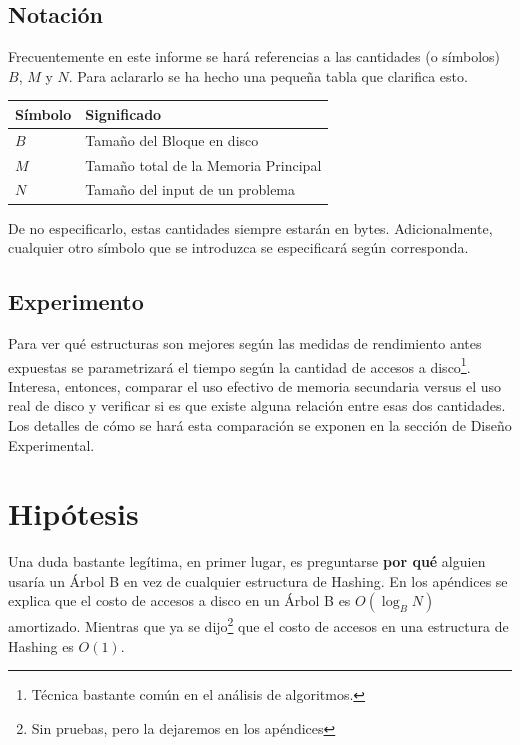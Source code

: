 \documentclass[12pt,letterpaper]{report}
\begin{document}
\subsection{Notación}

Frecuentemente en este informe se hará referencias a las cantidades (o símbolos) $B$, $M$ y $N$. Para aclararlo se ha hecho una pequeña tabla que clarifica esto.

\begin{center}
\begin{tabular}{l|l}
Símbolo & Significado \\ \hline
$B$ & Tamaño del Bloque en disco \\
$M$ & Tamaño total de la Memoria Principal \\
$N$ & Tamaño del input de un problema
\end{tabular}
\end{center}

De no especificarlo, estas cantidades siempre estarán en bytes. Adicionalmente, cualquier otro símbolo que se introduzca se especificará según corresponda.

\subsection{Experimento}

Para ver qué estructuras son mejores según las medidas de rendimiento antes expuestas se parametrizará el tiempo según la cantidad de accesos a disco\footnote{Técnica bastante común en el análisis de algoritmos.}.\\

Interesa, entonces, comparar el uso efectivo de memoria secundaria versus el uso real de disco y verificar si es que existe alguna relación entre esas dos cantidades. Los detalles de cómo se hará esta comparación se exponen en la sección de Diseño Experimental.

\newpage
\section{Hipótesis}
Una duda bastante legítima, en primer lugar, es preguntarse \textbf{por qué} alguien usaría un Árbol B en vez de cualquier estructura de Hashing. En los apéndices se explica que el costo de accesos a disco en un Árbol B es $O(\log_B N)$ amortizado. Mientras que ya se dijo\footnote{Sin pruebas, pero la dejaremos en los apéndices} que el costo de accesos en una estructura de Hashing es $O(1)$.\\
\end{document}
